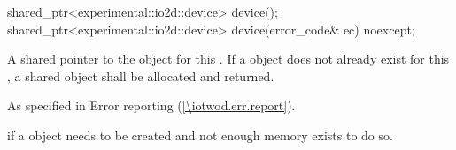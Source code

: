 \begin{itemdecl}
shared_ptr<experimental::io2d::device> device();
shared_ptr<experimental::io2d::device> device(error_code& ec) noexcept;
\end{itemdecl}
\begin{itemdescr}
\pnum
\returns
A shared pointer to the  object for this . If a  object does not already exist for this , a shared  object shall be allocated and returned.

\pnum
\throws
As specified in Error reporting (\ref{\iotwod.err.report}).

\pnum
\errors
{} if a  object needs to be created and not enough memory exists to do so.
\end{itemdescr}

